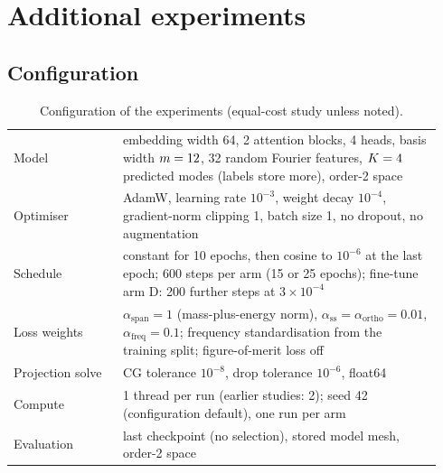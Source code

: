 \section{Additional experiments}\label{sec:A07-experiments}

\subsection{Configuration}\label{sec:A07-config}
\begin{table}[t]
\centering\small
\caption{Configuration of the experiments (equal-cost study unless noted).}
\label{tab:A07-hyper}
\begin{tabular}{p{0.24\linewidth}p{0.70\linewidth}}
\toprule
Model & embedding width 64, 2 attention blocks, 4 heads, basis width $m=12$, 32 random Fourier features, $K=4$ predicted modes (labels store more), order-2 space\\
Optimiser & AdamW, learning rate $10^{-3}$, weight decay $10^{-4}$, gradient-norm clipping 1, batch size 1, no dropout, no augmentation\\
Schedule & constant for 10 epochs, then cosine to $10^{-6}$ at the last epoch; 600 steps per arm (15 or 25 epochs); fine-tune arm D: 200 further steps at $3\times10^{-4}$\\
Loss weights & $\alpha_{\mathrm{span}}=1$ (mass-plus-energy norm), $\alpha_{\mathrm{ss}}=\alpha_{\mathrm{ortho}}=0.01$, $\alpha_{\mathrm{freq}}=0.1$; frequency standardisation from the training split; figure-of-merit loss off\\
Projection solve & CG tolerance $10^{-8}$, drop tolerance $10^{-6}$, float64\\
Compute & 1 thread per run (earlier studies: 2); seed 42 (configuration default), one run per arm\\
Evaluation & last checkpoint (no selection), stored model mesh, order-2 space\\
\bottomrule
\end{tabular}
\end{table}

